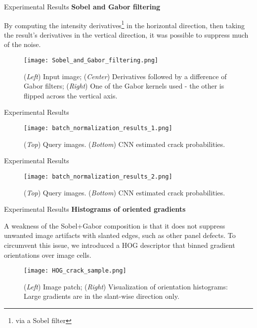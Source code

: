 \documentclass[10pt]{beamer}
\begin{document}
\begin{frame}{Experimental Results}
\textbf{Sobel and Gabor filtering}

By computing the intensity derivatives\footnote{via a Sobel filter} in the horizontal direction, then taking the result's derivatives in the vertical direction, it was possible to suppress much of the noise.

\begin{figure}
	\texttt{[image: Sobel\_and\_Gabor\_filtering.png]}
	\caption{(\emph{Left}) Input image; (\emph{Center}) Derivatives followed by a difference of Gabor filters; (\emph{Right}) One of the Gabor kernels used - the other is flipped across the vertical axis.}
\end{figure}

\end{frame}

\begin{frame}{Experimental Results}
	\begin{figure}
	\texttt{[image: batch\_normalization\_results\_1.png]}
	\caption{(\emph{Top}) Query images. (\emph{Bottom}) CNN estimated crack probabilities.}
	\end{figure}
\end{frame}

\begin{frame}{Experimental Results}
	\begin{figure}
	\texttt{[image: batch\_normalization\_results\_2.png]}
	\caption{(\emph{Top}) Query images. (\emph{Bottom}) CNN estimated crack probabilities.}
	\end{figure}
\end{frame}

\begin{frame}{Experimental Results}
\textbf{Histograms of oriented gradients}

A weakness of the Sobel+Gabor composition is that it does not suppress unwanted image artifacts with slanted edges, such as other panel defects. To circumvent this issue, we introduced a HOG descriptor that binned gradient orientations over image cells.

\begin{figure}
	\texttt{[image: HOG\_crack\_sample.png]}
	\caption{(\emph{Left}) Image patch; (\emph{Right}) Visualization of orientation histograms: Large gradients are in the slant-wise direction only.}
\end{figure}

\end{frame}
\end{document}
